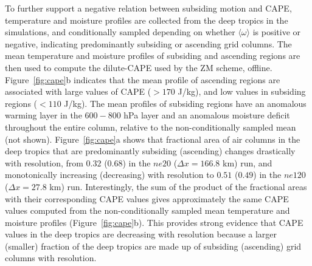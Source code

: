 To further support a negative relation between subsiding motion and CAPE, temperature and moisture profiles are collected from the deep tropics in the simulations, and conditionally sampled depending on whether $\langle \omega \rangle$ is positive or negative, indicating predominantly subsiding or ascending grid columns. The mean temperature and moisture profiles of subsiding and ascending regions are then used to compute the dilute-CAPE used by the ZM scheme, offline. Figure~\ref{fig:cape}b indicates that the mean profile of ascending regions are associated with large values of CAPE ($>170$ J/kg), and low values in subsiding regions ($<110$ J/kg). The mean profiles of subsiding regions have an anomalous warming layer in the $600-800$ hPa layer and an anomalous moisture deficit throughout the entire column, relative to the non-conditionally sampled mean (not shown). Figure~\ref{fig:cape}a shows that fractional area of air columns in the deep tropics that are predominantly subsiding (ascending) changes drastically with resolution, from $0.32$ ($0.68$) in the $ne20$ ($\Delta x = 166.8$ km) run, and monotonically increasing (decreasing) with resolution to $0.51$ ($0.49$) in the $ne120$ ($\Delta x = 27.8$ km) run. Interestingly, the sum of the product of the fractional areas with their corresponding CAPE values gives approximately the same CAPE values computed from the non-conditionally sampled mean temperature and moisture profiles (Figure~\ref{fig:cape}b). This provides strong evidence that CAPE values in the deep tropics are decreasing with resolution because a larger (smaller) fraction of the deep tropics are made up of subsiding (ascending) grid columns with resolution.


